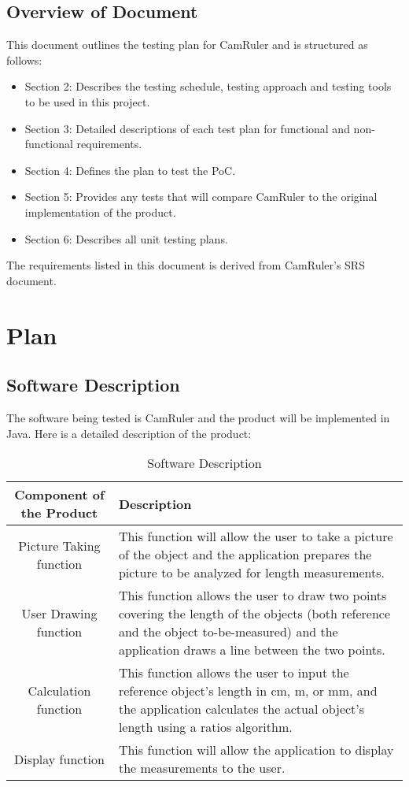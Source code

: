 \documentclass[12pt, titlepage]{article}
\begin{document}
\subsection{Overview of Document}
This document outlines the testing plan for CamRuler and is structured as follows: 
\begin{itemize}
\item Section 2: Describes the testing schedule, testing approach and testing tools to be used in this project.
\item Section 3: Detailed descriptions of each test plan for functional and non-functional requirements.
\item Section 4: Defines the plan to test the PoC.
\item Section 5: Provides any tests that will compare CamRuler to the original implementation of the product.
\item Section 6: Describes all unit testing plans. 
\end{itemize}

The requirements listed in this document is derived from CamRuler's SRS document.

\section{Plan}

\subsection{Software Description}
The software being tested is CamRuler and the product will be implemented in Java. Here is a detailed description of the product:
\begin{table}[H]
    \caption{Software Description} 
	\label{Table}
	\begin{tabular}{|c|L|}
		\hline
		\hline
		Component of the Product & Description\\
		\hline
		Picture Taking function & This function will allow the user to take a picture of the object and the application prepares the picture to be analyzed for length measurements.\\
		\hline
		User Drawing function & This function allows the user to draw two points covering the length of the objects (both reference and the object to-be-measured) and the application draws a line between the two points.\\ 
		\hline 
		Calculation function & This function allows the user to input the reference object's length in cm, m, or mm, and the application calculates the actual object's length using a ratios algorithm.\\
		\hline
		Display function & This function will allow the application to display the measurements to the user.\\ 
		\hline
		\hline
	\end{tabular}
\end{table}
\end{document}
